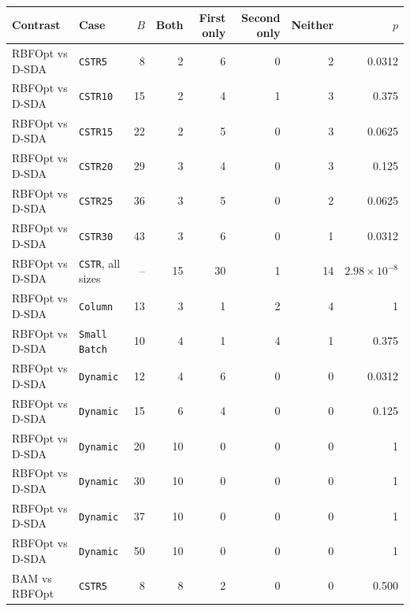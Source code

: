 \begin{tabular}{llrrrrrr}\toprule
Contrast & Case & \(B\) & Both & First only & Second only & Neither & \(p\)\\\midrule
RBFOpt vs D-SDA & \texttt{CSTR5} & 8 & 2 & 6 & 0 & 2 & 0.0312 \\
RBFOpt vs D-SDA & \texttt{CSTR10} & 15 & 2 & 4 & 1 & 3 & 0.375 \\
RBFOpt vs D-SDA & \texttt{CSTR15} & 22 & 2 & 5 & 0 & 3 & 0.0625 \\
RBFOpt vs D-SDA & \texttt{CSTR20} & 29 & 3 & 4 & 0 & 3 & 0.125 \\
RBFOpt vs D-SDA & \texttt{CSTR25} & 36 & 3 & 5 & 0 & 2 & 0.0625 \\
RBFOpt vs D-SDA & \texttt{CSTR30} & 43 & 3 & 6 & 0 & 1 & 0.0312 \\
RBFOpt vs D-SDA & \texttt{CSTR}, all sizes & -- & 15 & 30 & 1 & 14 & \(2.98\times10^{-8}\) \\
RBFOpt vs D-SDA & \texttt{Column} & 13 & 3 & 1 & 2 & 4 & 1 \\
RBFOpt vs D-SDA & \texttt{Small Batch} & 10 & 4 & 1 & 4 & 1 & 0.375 \\
RBFOpt vs D-SDA & \texttt{Dynamic} & 12 & 4 & 6 & 0 & 0 & 0.0312 \\
RBFOpt vs D-SDA & \texttt{Dynamic} & 15 & 6 & 4 & 0 & 0 & 0.125 \\
RBFOpt vs D-SDA & \texttt{Dynamic} & 20 & 10 & 0 & 0 & 0 & 1 \\
RBFOpt vs D-SDA & \texttt{Dynamic} & 30 & 10 & 0 & 0 & 0 & 1 \\
RBFOpt vs D-SDA & \texttt{Dynamic} & 37 & 10 & 0 & 0 & 0 & 1 \\
RBFOpt vs D-SDA & \texttt{Dynamic} & 50 & 10 & 0 & 0 & 0 & 1 \\
BAM vs RBFOpt & \texttt{CSTR5} & 8 & 8 & 2 & 0 & 0 & 0.500 \\
\bottomrule\end{tabular}
